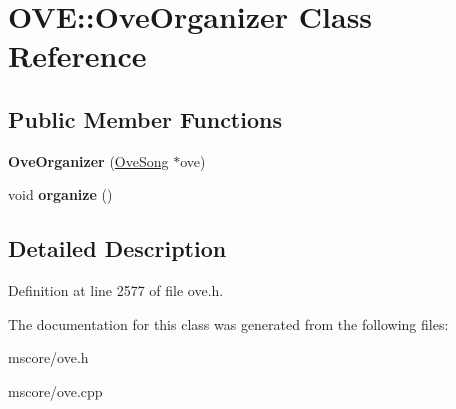 \hypertarget{class_o_v_e_1_1_ove_organizer}{}\section{O\+VE\+:\+:Ove\+Organizer Class Reference}
\label{class_o_v_e_1_1_ove_organizer}
\subsection*{Public Member Functions}
\begin{DoxyCompactItemize}
\item 
\mbox{\label{class_o_v_e_1_1_ove_organizer_a16eb544931ca57fe1a957998952f884e}} 
{\bfseries Ove\+Organizer} (\hyperlink{class_o_v_e_1_1_ove_song}{Ove\+Song} $\ast$ove)
\item 
\mbox{\label{class_o_v_e_1_1_ove_organizer_a2f294012ed24b44635ebec985dd70ef6}} 
void {\bfseries organize} ()
\end{DoxyCompactItemize}


\subsection{Detailed Description}


Definition at line 2577 of file ove.\+h.



The documentation for this class was generated from the following files\+:\begin{DoxyCompactItemize}
\item 
mscore/ove.\+h\item 
mscore/ove.\+cpp\end{DoxyCompactItemize}
